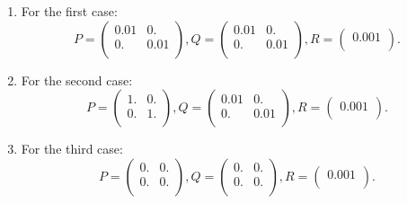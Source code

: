\begin{enumerate}[label=\textbullet]
	\item For the first case:
	        $$P=\begin{pmatrix}
            0.01 & 0. \\
            0. & 0.01 \\
            \end{pmatrix} ,
            Q=\begin{pmatrix}
            0.01 & 0.\\
            0. & 0.01 \\
            \end{pmatrix},
            R=\begin{pmatrix}
            0.001 \\
            \end{pmatrix}.$$ 
        \item For the second case:
	        $$P=\begin{pmatrix}
            1. & 0. \\
            0. & 1.\\
            \end{pmatrix} ,
            Q=\begin{pmatrix}
            0.01 & 0.\\
            0. & 0.01 \\
            \end{pmatrix},
            R=\begin{pmatrix}
            0.001 \\
            \end{pmatrix}.$$ 
        \item For the third case:
	        $$P=\begin{pmatrix}
            0. & 0. \\
            0. & 0.\\
            \end{pmatrix} ,
            Q=\begin{pmatrix}
            0. & 0.\\
            0. & 0. \\
            \end{pmatrix},
            R=\begin{pmatrix}
            0.001 \\
            \end{pmatrix}.$$ 
\end{enumerate}
